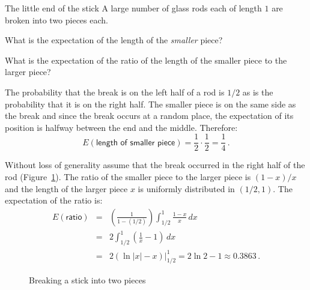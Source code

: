 



\begin{prob}{The little end of the stick}
A large number of glass rods each of length $1$ are broken into two pieces each.

 What is the expectation of the length of the \emph{smaller} piece?

 What is the expectation of the ratio of the length of the smaller piece to the larger piece?
\end{prob}

\solution{}

 The probability that the break is on the left half of a rod is $1/2$ as is the probability that it is on the right half.
The smaller piece is on the same side as the break and since the break occurs at a random place, the expectation of its position is halfway between the end and the middle. Therefore:
\[
E(\textsf{length of smaller piece}) = \frac{1}{2}\cdot\frac{1}{2}=\frac{1}{4}\,.
\]

 Without loss of generality assume that the break occurred in the right half of the rod (Figure~\ref{f.stick}). The ratio of the smaller piece to the larger piece is $(1-x)/x$ and the length of the larger piece $x$ is uniformly distributed in $(1/2,1)$. The expectation of the ratio is:
\begin{eqnarray*}
E(\textsf{ratio})&=&\left(\frac{1}{1-(1/2)}\right)\int_{1/2}^1 \frac{1-x}{x} \,dx\\
&=& 2\int_{1/2}^1 \left(\frac{1}{x} -1\right) \,dx \\
&=& 2\left.(\ln |x| - x)\right|_{1/2}^1 = 2\ln 2 -1\approx 0.3863\,.
\end{eqnarray*}
\begin{figure}[tb]
\begin{center}
\end{center}
\caption{Breaking a stick into two pieces}\label{f.stick}
\end{figure}

